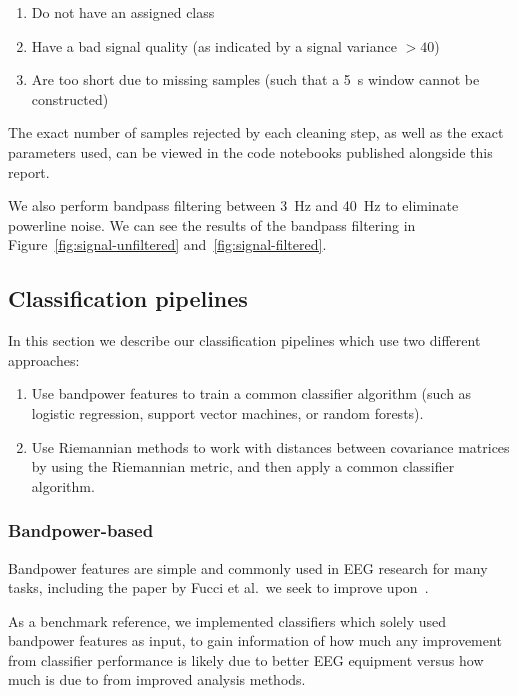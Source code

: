         \begin{enumerate}
            \item Do not have an assigned class
            \item Have a bad signal quality (as indicated by a signal variance $>40$)
            \item Are too short due to missing samples (such that a \SI{5}{\second} window cannot be constructed)
        \end{enumerate}

        The exact number of samples rejected by each cleaning step, as well as the exact parameters used, can be viewed in the code notebooks published alongside this report.

        We also perform bandpass filtering between \SI{3}{\hertz} and \SI{40}{\hertz} to eliminate powerline noise. We can see the results of the bandpass filtering in Figure~\ref{fig:signal-unfiltered} and~\ref{fig:signal-filtered}.

    \subsection{Classification pipelines}

        In this section we describe our classification pipelines which use two different approaches:

        \begin{enumerate}
            \item Use bandpower features to train a common classifier algorithm (such as logistic regression, support vector machines, or random forests).
            \item Use Riemannian methods to work with distances between covariance matrices by using the Riemannian metric, and then apply a common classifier algorithm.
        \end{enumerate}

        \subsubsection{Bandpower-based}\label{section:method-bandpower}

            Bandpower features are simple and commonly used in EEG research for many tasks, including the paper by Fucci et al.\ we seek to improve upon~\cite{fucci_replication_2019}. 

            As a benchmark reference, we implemented classifiers which solely used bandpower features as input, to gain information of how much any improvement from classifier performance is likely due to better EEG equipment versus how much is due to from improved analysis methods.

